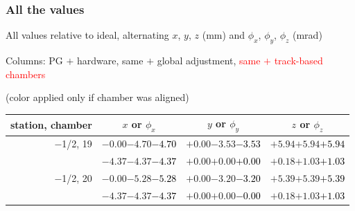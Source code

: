 \documentclass[compress]{beamer}
\begin{document}
\begin{frame}
\frametitle{All the values}
\tiny

All values relative to ideal, alternating $x$, $y$, $z$ (mm) and $\phi_x$, $\phi_y$, $\phi_z$ (mrad)

Columns: PG $+$ hardware, same $+$ global adjustment, \textcolor{red}{same $+$ track-based chambers}

\hfill (color applied only if chamber was aligned)

\vfill
\renewcommand{\arraystretch}{1.1}
\begin{tabular}{r | c | c | c}
station, chamber & $x$ or $\phi_x$ & $y$ or $\phi_y$ & $z$ or $\phi_z$ \\\hline
$-$1/2, 19 & $-0.00$\hspace{0.1 cm}$-4.70$\hspace{0.1 cm}\textcolor{black}{$-4.70$} & $+0.00$\hspace{0.1 cm}$-3.53$\hspace{0.1 cm}\textcolor{black}{$-3.53$} & $+5.94$\hspace{0.1 cm}$+5.94$\hspace{0.1 cm}\textcolor{black}{$+5.94$} \\
           & $-4.37$\hspace{0.1 cm}$-4.37$\hspace{0.1 cm}\textcolor{black}{$-4.37$} & $+0.00$\hspace{0.1 cm}$+0.00$\hspace{0.1 cm}\textcolor{black}{$+0.00$} & $+0.18$\hspace{0.1 cm}$+1.03$\hspace{0.1 cm}\textcolor{black}{$+1.03$} \\
$-$1/2, 20 & $-0.00$\hspace{0.1 cm}$-5.28$\hspace{0.1 cm}\textcolor{black}{$-5.28$} & $+0.00$\hspace{0.1 cm}$-3.20$\hspace{0.1 cm}\textcolor{black}{$-3.20$} & $+5.39$\hspace{0.1 cm}$+5.39$\hspace{0.1 cm}\textcolor{black}{$+5.39$} \\
           & $-4.37$\hspace{0.1 cm}$-4.37$\hspace{0.1 cm}\textcolor{black}{$-4.37$} & $+0.00$\hspace{0.1 cm}$+0.00$\hspace{0.1 cm}\textcolor{black}{$-0.00$} & $+0.18$\hspace{0.1 cm}$+1.03$\hspace{0.1 cm}\textcolor{black}{$+1.03$} \\

\end{tabular}
\end{frame}
\end{document}
